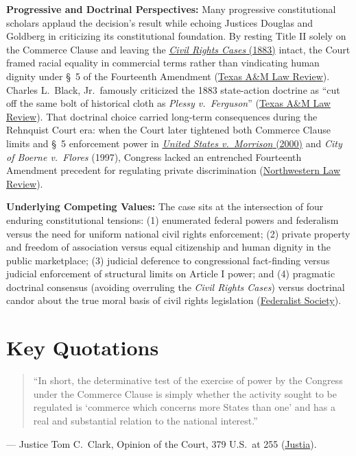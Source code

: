 \documentclass[12pt]{article}
\begin{document}
\textbf{Progressive and Doctrinal Perspectives:} Many progressive constitutional scholars applaud the decision's result while echoing Justices Douglas and Goldberg in criticizing its constitutional foundation. By resting Title II solely on the Commerce Clause and leaving the \href{https://fedsoc.org/case/the-civil-rights-cases}{\textit{Civil Rights Cases} (1883)} intact, the Court framed racial equality in commercial terms rather than vindicating human dignity under \S~5 of the Fourteenth Amendment (\href{https://scholarship.law.tamu.edu/cgi/viewcontent.cgi?article=1359&context=lawreview}{Texas A\&M Law Review}). Charles L.\ Black, Jr.\ famously criticized the 1883 state-action doctrine as ``cut off the same bolt of historical cloth as \textit{Plessy v.\ Ferguson}'' (\href{https://scholarship.law.tamu.edu/cgi/viewcontent.cgi?article=1359&context=lawreview}{Texas A\&M Law Review}). That doctrinal choice carried long-term consequences during the Rehnquist Court era: when the Court later tightened both Commerce Clause limits and \S~5 enforcement power in \href{https://supreme.justia.com/cases/federal/us/529/598/}{\textit{United States v.\ Morrison} (2000)} and \textit{City of Boerne v.\ Flores} (1997), Congress lacked an entrenched Fourteenth Amendment precedent for regulating private discrimination (\href{https://scholarlycommons.law.northwestern.edu/cgi/viewcontent.cgi?article=1349&context=nulr}{Northwestern Law Review}).

\textbf{Underlying Competing Values:} The case sits at the intersection of four enduring constitutional tensions: (1) enumerated federal powers and federalism versus the need for uniform national civil rights enforcement; (2) private property and freedom of association versus equal citizenship and human dignity in the public marketplace; (3) judicial deference to congressional fact-finding versus judicial enforcement of structural limits on Article I power; and (4) pragmatic doctrinal consensus (avoiding overruling the \textit{Civil Rights Cases}) versus doctrinal candor about the true moral basis of civil rights legislation (\href{https://fedsoc.org/case/heart-of-atlanta-motel-inc-v-united-states}{Federalist Society}).

\section{Key Quotations}
\begin{quote}
``In short, the determinative test of the exercise of power by the Congress under the Commerce Clause is simply whether the activity sought to be regulated is `commerce which concerns more States than one' and has a real and substantial relation to the national interest.''
\end{quote}
\noindent --- Justice Tom C.\ Clark, Opinion of the Court, 379 U.S.\ at 255 (\href{https://supreme.justia.com/cases/federal/us/379/241/}{Justia}).
\end{document}
